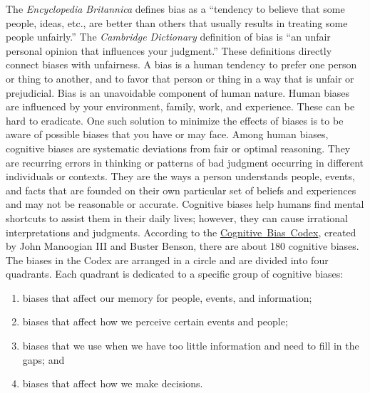 The \textit{Encyclopedia Britannica} defines bias as a ``tendency to believe that some \hbox{people,} ideas, etc., are better than others that usually results in treating some people unfairly.'' The \textit{Cambridge Dictionary} definition of bias is ``an unfair personal opinion that influences your judgment.'' These definitions directly connect biases with unfairness. A bias is a human tendency to prefer one person or thing to another, and to favor that person or thing in a way that is unfair or prejudicial. Bias is an unavoidable component of human nature. Human biases are influenced by your environment, family, work, and experience. These can be hard to eradicate. One such solution to minimize the effects of biases is to be aware\vadjust{\vspace*{-18pt}\pagebreak} of possible biases that you have or may face. Among human biases, cognitive biases are systematic deviations from fair or optimal reasoning. They are recurring errors in thinking or patterns of bad judgment occurring in different individuals or contexts. They are the ways a person understands people, events, and facts that are founded on their own particular set of beliefs and experiences and may not be reasonable or accurate. Cognitive biases help humans find mental shortcuts to assist them in their daily lives; however, they can cause irrational interpretations and judgments. According to the \href{https://www.sog.unc.edu/sites/www.sog.unc.edu/files/course\_materials/Cognitive\%20Biases\%20Codex.pdf}{Cognitive~Bias~Codex}, created by John Manoogian III and Buster Benson, there are about 180 cognitive biases. The biases in the Codex are arranged in a circle and are divided into four quadrants. Each quadrant is dedicated to a specific group of cognitive biases:

\def\labelenumi{(\arabic{enumi})}
\begin{enumerate}
\item biases that affect our memory for people, events, and information;
\item biases that affect how we perceive certain events and people;
\item biases that we use when we have too little information and need to fill in the gaps; and
\item biases that affect how we make decisions.
\end{enumerate}

